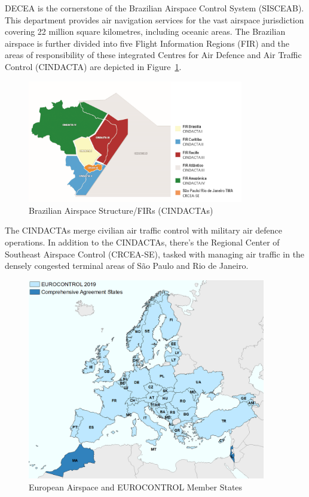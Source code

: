 \documentclass[
  a4paper,
  DIV=11,
  numbers=noendperiod]{scrreport}
\begin{document}
DECEA is the cornerstone of the Brazilian Airspace Control System
(SISCEAB). This department provides air navigation services for the vast
airspace jurisdiction covering 22 million square kilometres, including
oceanic areas. The Brazilian airspace is further divided into five
Flight Information Regions (FIR) and the areas of responsibility of
these integrated Centres for Air Defence and Air Traffic Control
(CINDACTA) are depicted in Figure~\ref{fig-BRA-airspace}.

\begin{figure}[H]

{\centering \includegraphics[width=3.71in,height=\textheight]{././figures/BRAZIL_CINDACTA_AND_CRCEA.png}

}

\caption{\label{fig-BRA-airspace}Brazilian Airspace Structure/FIRs
(CINDACTAs)}

\end{figure}

The CINDACTAs merge civilian air traffic control with military air
defence operations. In addition to the CINDACTAs, there's the Regional
Center of Southeast Airspace Control (CRCEA-SE), tasked with managing
air traffic in the densely congested terminal areas of São Paulo and Rio
de Janeiro.

\begin{figure}[H]

{\centering \includegraphics[width=4.09in,height=\textheight]{././figures/Europe-ECTRL.png}

}

\caption{\label{fig-EUR-airspace}European Airspace and EUROCONTROL
Member States}

\end{figure}
\end{document}
